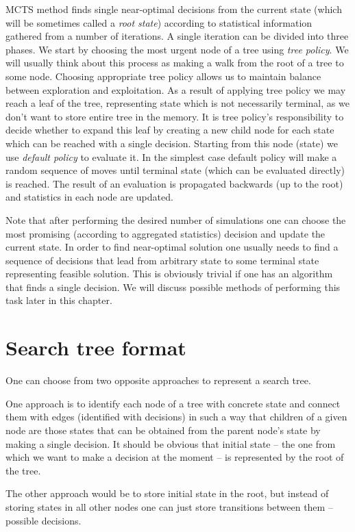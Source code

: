 MCTS method finds single near-optimal decisions from the current state (which
will be sometimes called a \emph{root state}) according to statistical
information gathered from a number of iterations. A single iteration can be
divided into three phases.
We start by choosing the most urgent node of a tree using \emph{tree policy}.
We will usually think about this process as making a walk from the root of a
tree to some node. Choosing appropriate tree policy allows us to maintain
balance between exploration and exploitation.
As a result of applying tree policy we may reach a leaf of the tree,
representing state which is not necessarily terminal, as we don't want to store
entire tree in the memory. It is tree policy's responsibility to decide whether
to expand this leaf by creating a new child node for each state which can be
reached with a single decision.
Starting from this node (state) we use \emph{default policy} to evaluate it.
In the simplest case default policy will make a random sequence of moves until
terminal state (which can be evaluated directly) is reached.
The result of an evaluation is propagated backwards (up to the root) and statistics
in each node are updated.

Note that after performing the desired number of simulations one can choose the
most promising (according to aggregated statistics) decision and update the
current state. In order to find near-optimal solution one usually needs to find
a sequence of decisions that lead from arbitrary state to some terminal state
representing feasible solution. This is obviously trivial if one has an
algorithm that finds a single decision. We will discuss possible methods of
performing this task later in this chapter.

\section{Search tree format}
One can choose from two opposite approaches to represent a search tree.

One approach is to identify each node of a tree with concrete state and connect
them with edges (identified with decisions) in such a way that children of a
given node are those states that can be obtained from the parent node's state by
making a single decision. It should be obvious that initial state -- the one from
which we want to make a decision at the moment -- is represented by the root of
the tree.

The other approach would be to store initial state in the root, but instead of
storing states in all other nodes one can just store transitions between them -- possible decisions.


